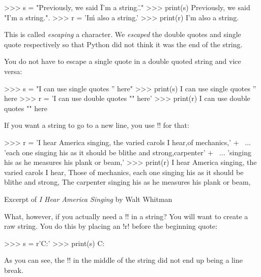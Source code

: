 \documentclass[11pt]{cselabheader}
\begin{document}
\begin{pyconcode}
>>> s = "Previously, we said \"I'm a string.\"."
>>> print(s)
Previously, we said "I'm a string.".
>>> r = 'I\'m also a string.'
>>> print(r)
I'm also a string.
\end{pyconcode}

This is called \emph{escaping} a character. We \emph{escaped} the double quotes
and single quote respectively so that Python did not think it was the end of
the string.

You do not have to escape a single quote in a double quoted string and vice
versa:

\begin{pyconcode}
>>> s = "I can use single quotes '' here"
>>> print(s)
I can use single quotes '' here
>>> r = 'I can use double quotes "" here'
>>> print(r)
I can use double quotes "" here
\end{pyconcode}

If you want a string to go to a new line, you use \pythoninline!\n! for that:

\begin{listing}[H]
  \vspace{-0.5em}
\begin{pyconcode}
>>> r = 'I hear America singing, the varied carols I hear,\nThose of mechanics,' + \
...     'each one singing his as it should be blithe and strong,\nThe carpenter' + \
...     'singing his as he measures his plank or beam,'
>>> print(r)
I hear America singing, the varied carols I hear,
Those of mechanics, each one singing his as it should be blithe and strong,
The carpenter singing his as he measures his plank or beam,
\end{pyconcode}
  \vspace{-1em}
  \caption{Excerpt of \emph{I Hear America Singing} by Walt Whitman}
  \vspace{-0.5em}
\end{listing}

What, however, if you actually need a \pythoninline!\n! in a string? You will want
to create a raw string. You do this by placing an \pythoninline!r! before the
beginning quote:

\begin{pyconcode}
>>> s = r'C:\Users\Files\nothing\more'
>>> print(s)
C:\Users\Files\nothing\more
\end{pyconcode}

As you can see, the \pythoninline!\n! in the middle of the string did not end up
being a line break.
\end{document}
